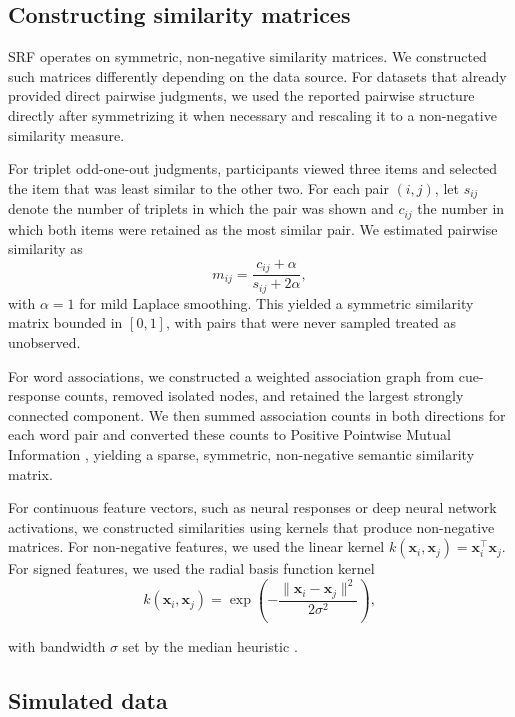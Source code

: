 \documentclass{article}
\begin{document}
\subsection{Constructing similarity matrices}
\label{sec:similarity_construction}

SRF operates on symmetric, non-negative similarity matrices. We constructed such matrices differently depending on the data source. For datasets that already provided direct pairwise judgments, we used the reported pairwise structure directly after symmetrizing it when necessary and rescaling it to a non-negative similarity measure.

For triplet odd-one-out judgments, participants viewed three items and selected the item that was least similar to the other two. For each pair $(i,j)$, let $s_{ij}$ denote the number of triplets in which the pair was shown and $c_{ij}$ the number in which both items were retained as the most similar pair. We estimated pairwise similarity as
\[
m_{ij} = \frac{c_{ij} + \alpha}{s_{ij} + 2\alpha},
\]
with $\alpha = 1$ for mild Laplace smoothing. This yielded a symmetric similarity matrix bounded in $[0,1]$, with pairs that were never sampled treated as unobserved.

For word associations, we constructed a weighted association graph from cue-response counts, removed isolated nodes, and retained the largest strongly connected component. We then summed association counts in both directions for each word pair and converted these counts to Positive Pointwise Mutual Information \citep[PPMI;][]{Church1990}, yielding a sparse, symmetric, non-negative semantic similarity matrix.

For continuous feature vectors, such as neural responses or deep neural network activations, we constructed similarities using kernels that produce non-negative matrices. For non-negative features, we used the linear kernel $k(\mathbf{x}_i, \mathbf{x}_j) = \mathbf{x}_i^\top \mathbf{x}_j$. For signed features, we used the radial basis function kernel
\begin{equation}
    k(\mathbf{x}_i, \mathbf{x}_j) = \exp\left(-\frac{\|\mathbf{x}_i - \mathbf{x}_j\|^2}{2\sigma^2}\right),    
\end{equation}

with bandwidth $\sigma$ set by the median heuristic \citep{Scholkopf2002}.

\subsection{Simulated data}
\end{document}
